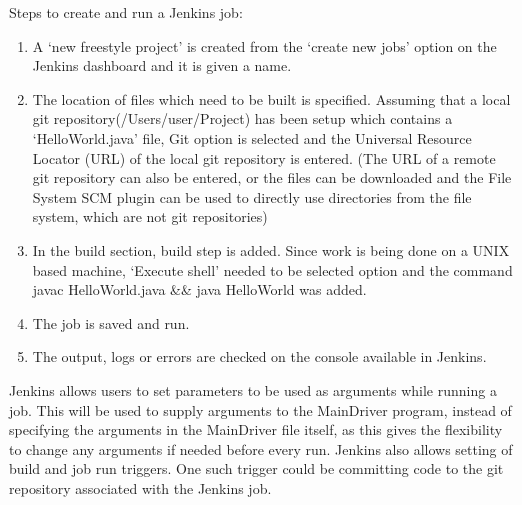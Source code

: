 Steps to create and run a Jenkins job:
\begin{enumerate}
	\item A `new freestyle project' is created from the `create new jobs' option on the Jenkins dashboard and it is given a name.
	\item The location of files which need to be built is specified. Assuming that a local git repository(/Users/user/Project) has been setup which contains a `HelloWorld.java' file, Git option is selected and the Universal Resource Locator (URL) of the local git repository is entered. (The URL of a remote git repository can also be entered, or the files can be downloaded and the File System SCM plugin can be used to directly use directories from the file system, which are not git repositories)
	\item In the build section, build step is added. Since work is being done on a UNIX based machine, `Execute shell' needed to be selected option and the command javac HelloWorld.java \&\& java HelloWorld was added.
	\item The job is saved and run.
	\item The output, logs or errors are checked on the console available in Jenkins.
\end{enumerate}
Jenkins allows users to set parameters to be used as arguments while running a job. This will be used to supply arguments to the MainDriver program, instead of specifying the arguments in the MainDriver file itself, as this gives the flexibility to change any arguments if needed before every run. Jenkins also allows setting of build and job run triggers. One such trigger could be committing code to the git repository associated with the Jenkins job.\\

